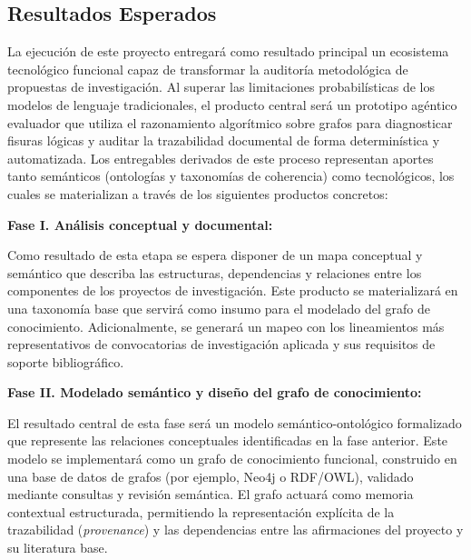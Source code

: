\documentclass[12pt,letterpaper]{article}
\begin{document}
\newpage
\subsection{Resultados Esperados}
\vspace{-0.5cm}


La ejecución de este proyecto entregará como resultado principal un ecosistema tecnológico funcional capaz de transformar la auditoría metodológica de propuestas de investigación. Al superar las limitaciones probabilísticas de los modelos de lenguaje tradicionales, el producto central será un prototipo agéntico evaluador que utiliza el razonamiento algorítmico sobre grafos para diagnosticar fisuras lógicas y auditar la trazabilidad documental de forma determinística y automatizada. Los entregables derivados de este proceso representan aportes tanto semánticos (ontologías y taxonomías de coherencia) como tecnológicos, los cuales se materializan a través de los siguientes productos concretos:

\textbf{Fase I. Análisis conceptual y documental:}

Como resultado de esta etapa se espera disponer de un mapa conceptual y semántico que describa las estructuras, dependencias y relaciones entre los componentes de los proyectos de investigación. Este producto se materializará en una taxonomía base que servirá como insumo para el modelado del grafo de conocimiento. Adicionalmente, se generará un mapeo con los lineamientos más representativos de convocatorias de investigación aplicada y sus requisitos de soporte bibliográfico.

\textbf{Fase II. Modelado semántico y diseño del grafo de conocimiento:}

El resultado central de esta fase será un modelo semántico-ontológico formalizado que represente las relaciones conceptuales identificadas en la fase anterior. Este modelo se implementará como un grafo de conocimiento funcional, construido en una base de datos de grafos (por ejemplo, Neo4j o RDF/OWL), validado mediante consultas y revisión semántica. El grafo actuará como memoria contextual estructurada, permitiendo la representación explícita de la trazabilidad (\textit{provenance}) y las dependencias entre las afirmaciones del proyecto y su literatura base. 
\end{document}
